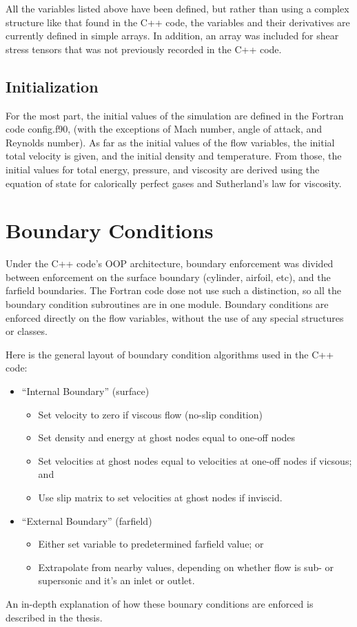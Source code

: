 \documentclass[12pt]{article}
\begin{document}
    All the variables listed above have been defined, but rather than using a complex structure like that found in the C++ code, the variables and their derivatives are currently defined in simple arrays. In addition, an array was included for shear stress tensors that was not previously recorded in the C++ code.

    \subsection{Initialization}
    For the most part, the initial values of the simulation are defined in the Fortran code config.f90, (with the exceptions of Mach number, angle of attack, and Reynolds number). As far as the initial values of the flow variables, the initial total velocity is given, and the initial density and temperature. From those, the initial values for total energy, pressure, and viscosity are derived using the equation of state for calorically perfect gases and Sutherland's law for viscosity.

    \section{Boundary Conditions}
    Under the C++ code's OOP architecture, boundary enforcement was divided between enforcement on the surface boundary (cylinder, airfoil, etc), and the farfield boundaries. The Fortran code dose not use such a distinction, so all the boundary condition subroutines are in one module. Boundary conditions are enforced directly on the flow variables, without the use of any special structures or classes.

    Here is the general layout of boundary condition algorithms used in the C++ code:
    \begin{itemize}
        \item ``Internal Boundary'' (surface)
        \begin{itemize}
            \item Set velocity to zero if viscous flow (no-slip condition)
            \item Set density and energy at ghost nodes equal to one-off nodes
            \item Set velocities at ghost nodes equal to velocities at one-off nodes if vicsous; and
            \item Use slip matrix to set velocities at ghost nodes if inviscid.
        \end{itemize}
        \item ``External Boundary'' (farfield)
        \begin{itemize}
            \item Either set variable to predetermined farfield value; or
            \item Extrapolate from nearby values, depending on whether flow is sub- or supersonic and it's an inlet or outlet.
        \end{itemize}
    \end{itemize}

    An in-depth explanation of how these bounary conditions are enforced is described in the thesis.
\end{document}
